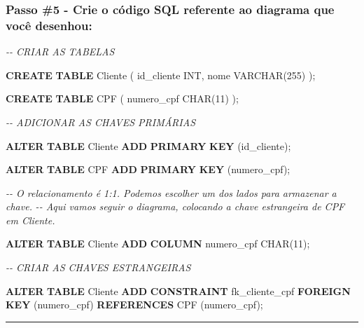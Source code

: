 \documentclass[
]{book}
\newenvironment{Shaded}{\begin{snugshade}}{\end{snugshade}}
\newcommand{\CommentTok}[1]{\textcolor[rgb]{0.56,0.35,0.01}{\textit{#1}}}
\newcommand{\DataTypeTok}[1]{\textcolor[rgb]{0.13,0.29,0.53}{#1}}
\newcommand{\DecValTok}[1]{\textcolor[rgb]{0.00,0.00,0.81}{#1}}
\newcommand{\KeywordTok}[1]{\textcolor[rgb]{0.13,0.29,0.53}{\textbf{#1}}}
\newcommand{\NormalTok}[1]{#1}
\begin{document}


\subsubsection{Passo \#5 - Crie o código SQL referente ao diagrama que você desenhou:}\label{passo-5---crie-o-cuxf3digo-sql-referente-ao-diagrama-que-vocuxea-desenhou-1}

\begin{Shaded}
\begin{Highlighting}[]

\CommentTok{{-}{-} CRIAR AS TABELAS}

\KeywordTok{CREATE} \KeywordTok{TABLE}\NormalTok{ Cliente }
\NormalTok{(}
\NormalTok{    id\_cliente }\DataTypeTok{INT}\NormalTok{,}
\NormalTok{    nome }\DataTypeTok{VARCHAR}\NormalTok{(}\DecValTok{255}\NormalTok{)}
\NormalTok{);}

\KeywordTok{CREATE} \KeywordTok{TABLE}\NormalTok{ CPF }
\NormalTok{(}
\NormalTok{    numero\_cpf }\DataTypeTok{CHAR}\NormalTok{(}\DecValTok{11}\NormalTok{)}
\NormalTok{);}

\CommentTok{{-}{-} ADICIONAR AS CHAVES PRIMÁRIAS}

\KeywordTok{ALTER} \KeywordTok{TABLE}\NormalTok{ Cliente }\KeywordTok{ADD} \KeywordTok{PRIMARY} \KeywordTok{KEY}\NormalTok{ (id\_cliente);}

\KeywordTok{ALTER} \KeywordTok{TABLE}\NormalTok{ CPF }\KeywordTok{ADD} \KeywordTok{PRIMARY} \KeywordTok{KEY}\NormalTok{ (numero\_cpf);}


\CommentTok{{-}{-} O relacionamento é 1:1. Podemos escolher um dos lados para armazenar a chave.}
\CommentTok{{-}{-} Aqui vamos seguir o diagrama, colocando a chave estrangeira de CPF em Cliente.}

\KeywordTok{ALTER} \KeywordTok{TABLE}\NormalTok{ Cliente }\KeywordTok{ADD} \KeywordTok{COLUMN}\NormalTok{ numero\_cpf }\DataTypeTok{CHAR}\NormalTok{(}\DecValTok{11}\NormalTok{);}

\CommentTok{{-}{-} CRIAR AS CHAVES ESTRANGEIRAS}

\KeywordTok{ALTER} \KeywordTok{TABLE}\NormalTok{ Cliente }\KeywordTok{ADD} \KeywordTok{CONSTRAINT}\NormalTok{ fk\_cliente\_cpf }\KeywordTok{FOREIGN} \KeywordTok{KEY}\NormalTok{ (numero\_cpf) }\KeywordTok{REFERENCES}\NormalTok{ CPF (numero\_cpf);}
\end{Highlighting}
\end{Shaded}

\begin{center}\rule{0.5\linewidth}{0.5pt}\end{center}
\end{document}
